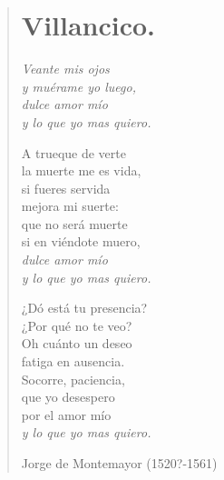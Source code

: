 \documentclass[12pt, twoside]{book}
\begin{document}
\begin{verse}
\begin{center}
\section{Villancico.}
\end{center}
\textit{Veante mis ojos\\
y muérame yo luego,\\
dulce amor mío\\
y lo que yo mas quiero.}
\newline

A trueque de verte\\
la muerte me es vida,\\
si fueres servida\\
mejora mi suerte:\\
que no será muerte\\
si en viéndote muero,\\
\textit{dulce amor mío\\
y lo que yo mas quiero.}\newline

¿Dó está tu presencia?\\
¿Por qué no te veo?\\
Oh cuánto un deseo\\
fatiga en ausencia.\\
Socorre, paciencia,\\
que yo desespero\\
por el amor mío\\
\textit{y lo que yo mas quiero.}\newline

Jorge de Montemayor (1520?-1561)
\end{verse}
\end{document}
